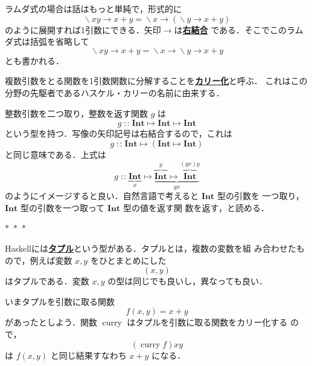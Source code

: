 \documentclass[a5paper,twoside,fleqn,draft]{jsbook}
\newcommand{\separator}{\begin{center}$*$~$*$~$*$\end{center}}
\newcommand{\programminglanguage}[1]{\textsf{#1}}
\newcommand{\haskell}{\programminglanguage{Haskell}}
\newcommand{\keyword}[1]{{\underline{\textbf{#1}}}}
\newcommand{\mSpecialFunc}[1]{\mathrm{#1}}
\DeclareMathOperator{\mCurry}{\mSpecialFunc{curry}}
\DeclareMathOperator{\mIn}{{:\!:}}
\DeclareMathOperator{\mLambda}{\backslash}
\DeclareMathOperator{\mLambdaArrow}{\rightarrow}
\DeclareMathOperator{\mMapsTo}{\mapsto}
\newcommand{\mType}[1]{\mathbf{#1}}
\newcommand{\mIntType}{\mType{Int}}
\newcommand{\mLambdaExp}[2]{\mLambda{#1}\mLambdaArrow{#2}}
\newcommand{\mProj}[2]{#1\mMapsTo#2}
\begin{document}
ラムダ式の場合は話はもっと単純で，形式的に
\begin{equation}
\mLambdaExp{xy}{x+y} =\mLambdaExp{x}{\left(\mLambdaExp{y}{x+y}\right)}
\end{equation}
のように展開すれば1引数にできる．矢印$\mLambdaArrow$は\keyword{右結合}
である．そこでこのラムダ式は括弧を省略して
\begin{equation}
\mLambdaExp{xy}{x+y} =\mLambdaExp{x}{\mLambdaExp{y}{x+y}}
\end{equation}
とも書かれる．

複数引数をとる関数を1引数関数に分解することを\keyword{カリー化}と呼ぶ．
これはこの分野の先駆者であるハスケル・カリーの名前に由来する．


整数引数を二つ取り，整数を返す関数 $g$ は
\begin{equation}
g\mIn\mProj{\mIntType}{\mProj{\mIntType}{\mIntType}}
\end{equation}
という型を持つ．写像の矢印記号は右結合するので，これは
\begin{equation}
g\mIn\mProj{\mIntType}{\left(\mProj{\mIntType}{\mIntType}\right)}
\end{equation}
と同じ意味である．上式は
\begin{equation*}
g\mIn \underbrace{\mIntType}_x
\mMapsTo\underbrace{\overbrace{\mIntType}^y
  \mMapsTo\overbrace{\mIntType}^{(gx)y}}_{gx}
\end{equation*}
のようにイメージすると良い．自然言語で考えると $\mIntType$ 型の引数を
一つ取り，$\mIntType$ 型の引数を一つ取って $\mIntType$ 型の値を返す関
数を返す，と読める．

\separator

\haskell には\keyword{タプル}という型がある．タプルとは，複数の変数を組
み合わせたもので，例えば変数 $x,y$ をひとまとめにした
\begin{equation}
(x,y)
\end{equation}
はタプルである．変数 $x,y$ の型は同じでも良いし，異なっても良い．

いまタプルを引数に取る関数
\begin{equation}
f(x,y)=x+y
\end{equation}
があったとしよう．関数 $\mCurry$ はタプルを引数に取る関数をカリー化する
ので，
\begin{equation}
(\mCurry f)xy
\end{equation}
は $f(x,y)$ と同じ結果すなわち $x+y$ になる．
\end{document}
